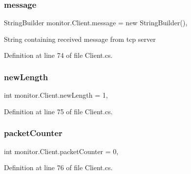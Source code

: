 \mbox{\label{classmonitor_1_1_client_a2ddb7073c4bf8a42c231939d5c21d68e}} 
\subsubsection{message}
{\footnotesize\ttfamily String\+Builder monitor.\+Client.\+message = new String\+Builder()\hspace{0.3cm}{\ttfamily [static]}, {\ttfamily [private]}}



String containing received message from tcp server 



Definition at line 74 of file Client.\+cs.

\mbox{\label{classmonitor_1_1_client_a7083940b8fea9df2b080e3844549e805}} 
\subsubsection{new\+Length}
{\footnotesize\ttfamily int monitor.\+Client.\+new\+Length = 1\hspace{0.3cm}{\ttfamily [static]}, {\ttfamily [private]}}



Definition at line 75 of file Client.\+cs.

\mbox{\label{classmonitor_1_1_client_a7eb13840c83beb2ab191cae3ba3210c9}} 
\subsubsection{packet\+Counter}
{\footnotesize\ttfamily int monitor.\+Client.\+packet\+Counter = 0\hspace{0.3cm}{\ttfamily [static]}, {\ttfamily [private]}}



Definition at line 76 of file Client.\+cs.

\mbox{\label{classmonitor_1_1_client_a01cb2a551d81fd82d2f7015e177f0f18}} 
